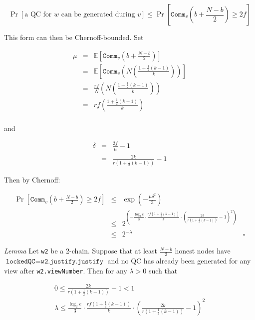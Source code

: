 \documentclass[11pt, oneside]{article}       %
\begin{document}
\[
    \Pr[\text{a QC for \(w\) can be generated during \(v\)}] \leq
    \Pr\left[\texttt{Comm}_v\left(b+\frac{N-b}{2}\right) \geq 2f\right]
\]

This form can then be Chernoff-bounded. Set

\[
    \begin{array}{rclr}
        \mu &=& \mathbb{E}\left[\texttt{Comm}_v\left(b +
        \frac{N-b}{2}\right)\right] \\
            &=& \mathbb{E}\left[\texttt{Comm}_v\left(N\left(\frac{1 +
            \frac{1}{2}(k-1)}{k}\right)\right)\right] \\
            &=& \frac{rf}{N}\left(N\left(\frac{1 +
            \frac{1}{2}(k-1)}{k}\right)\right) \\
            &=& rf\left(\frac{1 +
            \frac{1}{2}(k-1)}{k}\right) \\
    \end{array}
\]

and

\[
    \begin{array}{rclr}
        \delta &=& \frac{2f}{\mu} - 1 \\
        &=& \frac{2k}{r\left(1+\frac{1}{2}(k-1)\right)} - 1
    \end{array}
\]

Then by Chernoff:

\[
    \begin{array}{rclr}
        \Pr\left[\texttt{Comm}_v\left(b+\frac{N-b}{2}\right) \geq 2f\right]
        &\leq& \exp\left(-\frac{\mu{\delta}^2}{3}\right) \\

        &\leq& 2^{\left(-\frac{\log_2 e
        }{3}\cdot\frac{rf\left(1+\frac{1}{2}(k-1)\right)}{k}\cdot
        {\left(\frac{2k}{r\left(1+\frac{1}{2}(k-1)\right)} -
        1\right)}^2\right)} \\
        &\leq& 2^{-\lambda} & \square
    \end{array}
\]

\emph{Lemma} Let \texttt{w2} be a 2-chain. Suppose that at least
\(\frac{N-b}{2}\) honest nodes have \(\texttt{lockedQC} =
\texttt{w2.justify.justify}\) and no QC has already been generated for any
view after \texttt{w2.viewNumber}. Then for any \(\lambda > 0\) such that

\begin{equation}\label{lemma_majority}
    \begin{array}{c}
        0 \leq \frac{2k}{r\left(1+\frac{1}{2}(k-1)\right)} - 1 < 1 \\
        \lambda \leq \frac{\log_2 e
        }{3}\cdot\frac{rf\left(1+\frac{1}{2}(k-1)\right)}{k}\cdot
        {\left(\frac{2k}{r\left(1+\frac{1}{2}(k-1)\right)} - 1\right)}^2
    \end{array}
\end{equation}
\end{document}
